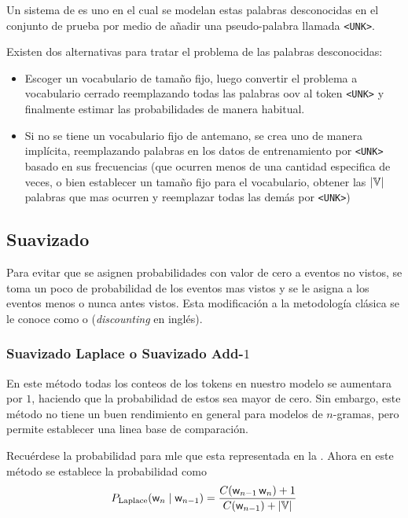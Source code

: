 Un sistema de  es uno en el cual se modelan estas palabras desconocidas en el conjunto de prueba por medio de añadir una pseudo-palabra llamada \texttt{<UNK>}.

Existen dos alternativas para tratar el problema de las palabras desconocidas:
\begin{itemize}
\item Escoger un vocabulario de tamaño fijo, luego convertir el problema a vocabulario cerrado reemplazando todas las palabras \gls{oov} al token \texttt{<UNK>} y finalmente estimar las probabilidades de manera habitual.
  
\item Si no se tiene un vocabulario fijo de antemano, se crea uno de manera implícita, reemplazando palabras en los datos de entrenamiento por \texttt{<UNK>} basado en sus frecuencias (que ocurren menos de una cantidad especifica de veces, o bien establecer un tamaño fijo para el vocabulario, obtener las $|{\mathbb{V}}|$ palabras que mas ocurren y reemplazar todas las demás por \texttt{<UNK>})
\end{itemize}


\subsection{Suavizado}
Para evitar que se asignen probabilidades con valor de cero a eventos no vistos, se toma un poco de probabilidad de los eventos mas vistos y se le asigna a los eventos menos o nunca antes vistos. Esta modificación a la metodología clásica se le conoce como  o  (\textsl{discounting} en inglés).

\subsubsection{Suavizado Laplace o Suavizado Add-$1$}
En este método todas los conteos de los tokens en nuestro modelo se aumentara por $1$, haciendo que la probabilidad de estos sea mayor de cero. Sin embargo, este método no tiene un buen rendimiento en general para modelos de $n$-gramas, pero permite establecer una linea base de comparación.

Recuérdese la probabilidad para \gls{mle} que esta representada en la . Ahora en este método se establece la probabilidad como
\begin{equation} \label{eq:laplace-smoothing}
  P_{\mathrm{Laplace}}({\mathit{\mathsf{w}}}_n \mid {\mathit{\mathsf{w}}}_{n-1}) = \frac{C({\mathit{\mathsf{w}}}_{n-1} \, {\mathit{\mathsf{w}}}_n) +1}{C({\mathit{\mathsf{w}}}_{n-1}) + |{\mathbb{V}}|}
\end{equation}

